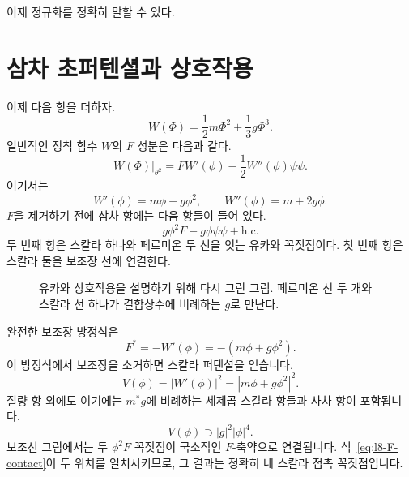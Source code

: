 이제 정규화를 정확히 말할 수 있다.

\section{삼차 초퍼텐셜과 상호작용}

이제 다음 항을 더하자.
\begin{equation}
W(\Phi)=\frac12m\Phi^2+\frac13g\Phi^3.
\label{eq:l8-superpotential}
\end{equation}
일반적인 정칙 함수 \(W\)의 \(F\) 성분은 다음과 같다.
\begin{equation}
\left.W(\Phi)\right|_{\theta^2}
=F W'(\phi)-\frac12W''(\phi)\psi\psi.
\label{eq:l8-W-components}
\end{equation}
여기서는
\begin{equation}
W'(\phi)=m\phi+g\phi^2,
\qquad
W''(\phi)=m+2g\phi.
\end{equation}
\(F\)을 제거하기 전에 삼차 항에는 다음 항들이 들어 있다.
\begin{equation}
g\phi^2F-g\phi\psi\psi+\text{h.c.}
\label{eq:l8-cubic-offshell}
\end{equation}
두 번째 항은 스칼라 하나와 페르미온 두 선을 잇는 유카와 꼭짓점이다. 첫 번째 항은 스칼라 둘을 보조장 선에 연결한다.

\begin{figure}[H]\centering
{}\caption{유카와 상호작용을 설명하기 위해 다시 그린 그림. 페르미온 선 두 개와 스칼라 선 하나가 결합상수에 비례하는 \(g\)로 만난다.}\end{figure}

완전한 보조장 방정식은
\begin{equation}
F^\ast=-W'(\phi)=-(m\phi+g\phi^2).
\label{eq:l8-general-F-equation}
\end{equation}
이 방정식에서 보조장을 소거하면 스칼라 퍼텐셜을 얻습니다.
\begin{equation}
V(\phi)=|W'(\phi)|^2
=|m\phi+g\phi^2|^2.
\label{eq:l8-scalar-potential}
\end{equation}
질량 항 외에도 여기에는 \(m^\ast g\)에 비례하는 세제곱 스칼라 항들과 사차 항이 포함됩니다.
\begin{equation}
V(\phi)\supset |g|^2|\phi|^4.
\label{eq:l8-quartic}
\end{equation}
보조선 그림에서는 두 \(\phi^2F\) 꼭짓점이 국소적인 \(F\)-축약으로 연결됩니다. 식~\eqref{eq:l8-F-contact}이 두 위치를 일치시키므로, 그 결과는 정확히 네 스칼라 접촉 꼭짓점입니다.

